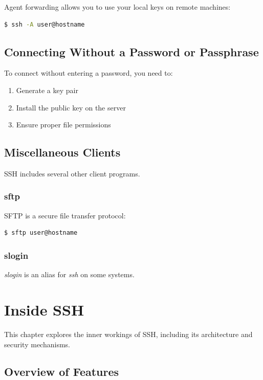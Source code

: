 \documentclass[12pt]{book}
\begin{document}
Agent forwarding allows you to use your local keys on remote machines:

\begin{lstlisting}[language=bash]
$ ssh -A user@hostname
\end{lstlisting}

\section{Connecting Without a Password or Passphrase}

To connect without entering a password, you need to:
\begin{enumerate}
    \item Generate a key pair
    \item Install the public key on the server
    \item Ensure proper file permissions
\end{enumerate}

\section{Miscellaneous Clients}

SSH includes several other client programs.

\subsection{sftp}

SFTP is a secure file transfer protocol:

\begin{lstlisting}[language=bash]
$ sftp user@hostname
\end{lstlisting}

\subsection{slogin}

\textit{slogin} is an alias for \textit{ssh} on some systems.

\chapter{Inside SSH}

This chapter explores the inner workings of SSH, including its architecture and security mechanisms.

\section{Overview of Features}
\end{document}
